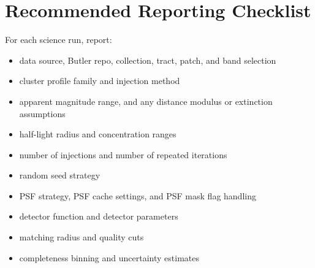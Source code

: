 \documentclass[11pt]{article}
\begin{document}
\section{Recommended Reporting Checklist}

For each science run, report:

\begin{itemize}[leftmargin=*]
    \item data source, Butler repo, collection, tract, patch, and band selection
    \item cluster profile family and injection method
    \item apparent magnitude range, and any distance modulus or extinction assumptions
    \item half-light radius and concentration ranges
    \item number of injections and number of repeated iterations
    \item random seed strategy
    \item PSF strategy, PSF cache settings, and PSF mask flag handling
    \item detector function and detector parameters
    \item matching radius and quality cuts
    \item completeness binning and uncertainty estimates
\end{itemize}
\end{document}
